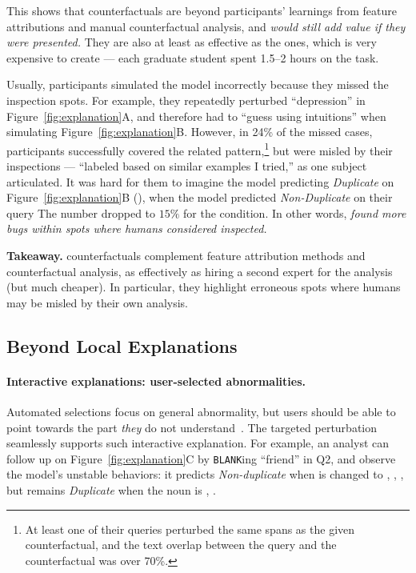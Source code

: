 This shows that \cshap counterfactuals are beyond participants' learnings from feature attributions and manual counterfactual analysis, and \emph{would still add value if they were presented.}
They are also at least as effective as the \chuman ones, which is very expensive to create --- each graduate student spent 1.5--2 hours on the task.


Usually, participants simulated the model incorrectly because they missed the inspection spots.
For example, they repeatedly perturbed ``depression'' in Figure~\ref{fig:explanation}A, and therefore had to ``guess using intuitions'' when simulating Figure~\ref{fig:explanation}B.
However, in 24\% of the missed \cshap cases, participants successfully covered the related pattern,\footnote{At least one of their queries perturbed the same spans as the given counterfactual, and the text overlap between the query and the counterfactual was over 70\%.} but were misled by their inspections --- ``labeled based on similar examples I tried,'' as one subject articulated.
It was hard for them to imagine the model predicting \emph{Duplicate} on Figure~\ref{fig:explanation}B (), when the model predicted \emph{Non-Duplicate} on their query 
The number dropped to $15\%$ for the \chuman condition.
In other words, \emph{\cshap found more bugs within spots where humans considered inspected.}

\noindent\textbf{Takeaway.}
\sysname counterfactuals complement feature attribution methods and counterfactual analysis, as effectively as hiring a second expert for the analysis (but much cheaper).
In particular, they highlight erroneous spots where humans may be misled by their own analysis.

\subsection{Beyond Local Explanations}
\label{subsec:exp_more}

\paragraph{Interactive explanations: user-selected abnormalities.}
Automated selections focus on general abnormality, but users should be able to point towards the part \emph{they} do not understand~\cite{miller}.
The targeted perturbation seamlessly supports such interactive explanation.
For example, an analyst can follow up on Figure~\ref{fig:explanation}C by \texttt{BLANK}ing ``friend'' in Q2, and observe the model's unstable behaviors: it predicts \emph{Non-duplicate} when  is changed to , , , but remains \emph{Duplicate} when the noun is , .


